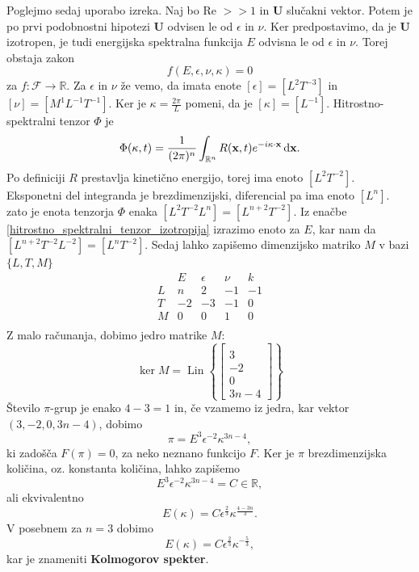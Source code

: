 \documentclass[mat2, tisk]{fmfdelo}
\newcommand{\R}{\mathbb R}
\newcommand{\bd}{\textbf}
\begin{document}
Poglejmo sedaj uporabo izreka. Naj bo Re $>\!\!> 1$ in $\bd{U}$ 
slučakni vektor. Potem je po prvi podobnostni hipotezi $\bd{U}$
odvisen le od $\epsilon$ in $\nu$. Ker predpostavimo, da je $\bd{U}$
izotropen, je tudi energijska spektralna funkcija $E$ odvisna le 
od $\epsilon$ in $\nu$. Torej obstaja zakon 
$$
f(E, \epsilon, \nu, \kappa) = 0
$$
za $f:\mathcal{F} \rightarrow \R$. Za $\epsilon$ in $\nu$ že vemo, da imata
enote $[\epsilon] = [L^2 T^{-3}]$ in $[\nu] = [M^1 L^{-1}T^{-1}]$. Ker je 
$\kappa = \frac{2\pi}{L}$ pomeni, da je $[\kappa] = [L^{-1}]$.
Hitrostno-spektralni tenzor $\Phi$ je 
$$
\Phi(\text{\bd{$\kappa$}}, t) = \frac{1}{(2\pi)^n} \int_{\R^n} {R}(\bd{x}, t) e^{-i\text{\bd{$\kappa$}} \cdot \bd{x}} \dif \bd{x}.
$$
Po definiciji $R$ prestavlja kinetično energijo, torej ima enoto $[L^2T^{-2}]$.
Eksponetni del integranda je brezdimenzijski, diferencial pa ima enoto $[L^{n}]$. zato je enota
tenzorja $\Phi$ enaka $[L^2T^{-2}L^n] = [L^{n+2}T^{-2}]$. Iz 
enačbe \ref{hitrostno_spektralni_tenzor_izotropija} izrazimo enoto za 
$E$, kar nam da $[L^{n+2} T^{-2} L^{-2}] = [L^n T^{-2}]$. Sedaj lahko 
zapišemo dimenzijsko matriko $M$ v bazi $\{L, T, M\}$
\[
\begin{array}{c|rrrr}
 & E & \epsilon & \nu & k \\[-3mm]
\hline
L & n & 2 & -1 & -1 \\[-3mm]
T & -2 & -3 & -1 & 0\\[-3mm]
M & 0 & 0 & 1 & 0 \\
\end{array}
\]
Z malo računanja, dobimo jedro matrike $M$:
$$
\operatorname{ker} M = \operatorname{Lin} \left\{ 
\begin{bmatrix} 
\\[-17mm]
3 \\[-5mm]
-2 \\[-5mm]
0 \\[-5mm]
3n - 4 
\end{bmatrix} 
\right\}$$
Število $\pi$-grup je enako $4 - 3 = 1$ in, če vzamemo iz jedra, kar vektor $(3, -2, 0, 3n-4)$,
dobimo
$$
\pi = E^{3} \epsilon^{-2} \kappa^{3n - 4}, 
$$
ki zadošča $F(\pi) = 0$, za neko neznano funkcijo $F$. Ker je $\pi$ brezdimenzijska količina,
oz. konstanta količina, lahko zapišemo
\begin{equation}
  E^{3} \epsilon^{-2} \kappa^{3n - 4} = C \in \R,
\end{equation}
ali ekvivalentno 
\begin{equation}
  E(\kappa) = C \epsilon^{\frac{2}{3}} \kappa^{\frac{4 - 3n}{3}}.
\end{equation}
V posebnem za $n=3$ dobimo 
\begin{equation}
E(\kappa) = C \epsilon^{\frac{2}{3}} \kappa^{-\frac{5}{3}},
\end{equation}
kar je znameniti \textbf{Kolmogorov spekter}.
\end{document}
